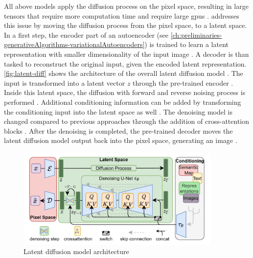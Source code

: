 All above models apply the diffusion process on the pixel space, resulting in large tensors that require more computation time and require large \glspl{gpu} \cite{rombach2022HighResolutionImageSynthesis}.
\cite{rombach2022HighResolutionImageSynthesis} addresses this issue by moving the diffusion process from the pixel space, to a latent space.
In a first step, the encoder part of an autoencoder (see \autoref{ch:preliminaries-generativeAlgorithms-variationalAutoencoders}) is trained to learn a latent representation with smaller dimensionality of the input image \cite{rombach2022HighResolutionImageSynthesis}.
A decoder is than tasked to reconstruct the original input, given the encoded latent representation.
\autoref{fig:latent-diff} shows the architecture of the overall latent diffusion model \cite[Figure 3, p.4]{rombach2022HighResolutionImageSynthesis}.
The input is transformed into a latent vector $z$ through the pre-trained encoder \cite{rombach2022HighResolutionImageSynthesis}.
Inside this latent space, the diffusion with forward and reverse noising process is performed \cite{rombach2022HighResolutionImageSynthesis}.
Additional conditioning information can be added by transforming the conditioning input into the latent space as well \cite{rombach2022HighResolutionImageSynthesis}.
The denoising model is changed compared to previous approaches through the addition of cross-attention blocks \cite{rombach2022HighResolutionImageSynthesis}.
After the denoising is completed, the pre-trained decoder moves the latent diffusion model output back into the pixel space, generating an image \cite{rombach2022HighResolutionImageSynthesis}.

\begin{figure}[h]
    \centering
    \includegraphics[width=0.9\textwidth]{images/latent-diff.png}
    \caption{Latent diffusion model architecture \cite[Figure 3, p.4]{rombach2022HighResolutionImageSynthesis}}
    \label{fig:latent-diff}
\end{figure}


